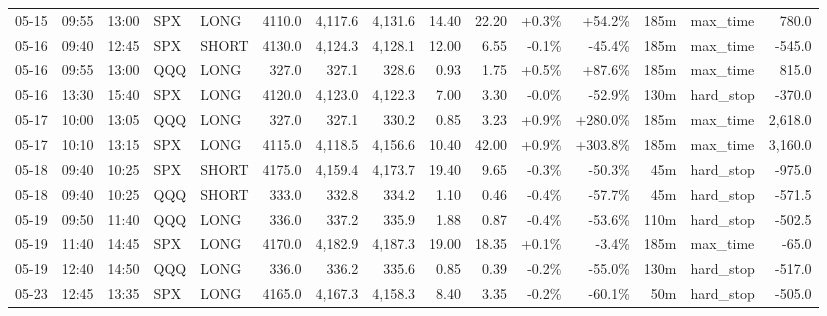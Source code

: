 \documentclass[11pt,a4paper,twoside]{article}
\begin{document}
\begin{landscape}
\begin{center}
\begin{longtable}{>{\color{txtmain}}l l l l l r r r r r r r r >{\color{txtmain}}l r}
05-15 & 09:55 & 13:00 & SPX & LONG & 4110.0 & 4,117.6 & 4,131.6 & 14.40 & 22.20 & \textcolor{wingreen}{+0.3\%} & \textcolor{wingreen}{+54.2\%} & 185m & max\_time & \textcolor{wingreen}{780.0} \\
05-16 & 09:40 & 12:45 & SPX & SHORT & 4130.0 & 4,124.3 & 4,128.1 & 12.00 & 6.55 & \textcolor{lossred}{-0.1\%} & \textcolor{lossred}{-45.4\%} & 185m & max\_time & \textcolor{lossred}{-545.0} \\
05-16 & 09:55 & 13:00 & QQQ & LONG & 327.0 & 327.1 & 328.6 & 0.93 & 1.75 & \textcolor{wingreen}{+0.5\%} & \textcolor{wingreen}{+87.6\%} & 185m & max\_time & \textcolor{wingreen}{815.0} \\
05-16 & 13:30 & 15:40 & SPX & LONG & 4120.0 & 4,123.0 & 4,122.3 & 7.00 & 3.30 & \textcolor{lossred}{-0.0\%} & \textcolor{lossred}{-52.9\%} & 130m & hard\_stop & \textcolor{lossred}{-370.0} \\
05-17 & 10:00 & 13:05 & QQQ & LONG & 327.0 & 327.1 & 330.2 & 0.85 & 3.23 & \textcolor{wingreen}{+0.9\%} & \textcolor{wingreen}{+280.0\%} & 185m & max\_time & \textcolor{wingreen}{2,618.0} \\
05-17 & 10:10 & 13:15 & SPX & LONG & 4115.0 & 4,118.5 & 4,156.6 & 10.40 & 42.00 & \textcolor{wingreen}{+0.9\%} & \textcolor{wingreen}{+303.8\%} & 185m & max\_time & \textcolor{wingreen}{3,160.0} \\
05-18 & 09:40 & 10:25 & SPX & SHORT & 4175.0 & 4,159.4 & 4,173.7 & 19.40 & 9.65 & \textcolor{lossred}{-0.3\%} & \textcolor{lossred}{-50.3\%} & 45m & hard\_stop & \textcolor{lossred}{-975.0} \\
05-18 & 09:40 & 10:25 & QQQ & SHORT & 333.0 & 332.8 & 334.2 & 1.10 & 0.46 & \textcolor{lossred}{-0.4\%} & \textcolor{lossred}{-57.7\%} & 45m & hard\_stop & \textcolor{lossred}{-571.5} \\
05-19 & 09:50 & 11:40 & QQQ & LONG & 336.0 & 337.2 & 335.9 & 1.88 & 0.87 & \textcolor{lossred}{-0.4\%} & \textcolor{lossred}{-53.6\%} & 110m & hard\_stop & \textcolor{lossred}{-502.5} \\
05-19 & 11:40 & 14:45 & SPX & LONG & 4170.0 & 4,182.9 & 4,187.3 & 19.00 & 18.35 & \textcolor{wingreen}{+0.1\%} & \textcolor{lossred}{-3.4\%} & 185m & max\_time & \textcolor{lossred}{-65.0} \\
05-19 & 12:40 & 14:50 & QQQ & LONG & 336.0 & 336.2 & 335.6 & 0.85 & 0.39 & \textcolor{lossred}{-0.2\%} & \textcolor{lossred}{-55.0\%} & 130m & hard\_stop & \textcolor{lossred}{-517.0} \\
05-23 & 12:45 & 13:35 & SPX & LONG & 4165.0 & 4,167.3 & 4,158.3 & 8.40 & 3.35 & \textcolor{lossred}{-0.2\%} & \textcolor{lossred}{-60.1\%} & 50m & hard\_stop & \textcolor{lossred}{-505.0} \\

\end{longtable}
\end{center}
\end{landscape}
\end{document}
